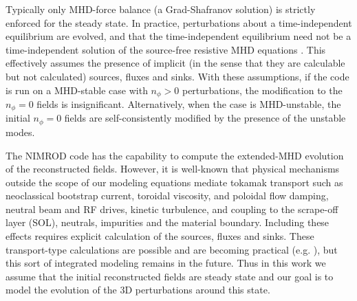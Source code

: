 % 

Typically only MHD-force balance (a Grad-Shafranov solution) is strictly
enforced for the steady state.  In practice, perturbations about a
time-independent equilibrium are evolved, and that the time-independent
equilibrium need not be a time-independent solution of the source-free
resistive MHD equations \cite{Sovinec04,charlton86}. This
effectively assumes the presence of implicit (in the sense that they are
calculable but not calculated) sources, fluxes and sinks.  With these
assumptions, if the code is run on a MHD-stable case with $n_\phi>0$
perturbations, the modification to the $n_\phi=0$ fields is insignificant.
Alternatively, when the case is MHD-unstable, the initial $n_\phi=0$ fields are
self-consistently modified by the presence of the unstable modes.

The NIMROD
code has the capability to compute the extended-MHD evolution of the
reconstructed fields. However, it is well-known that physical mechanisms
outside the scope of our modeling equations mediate tokamak transport such as
neoclassical bootstrap current, toroidal viscosity, and poloidal flow damping,
neutral beam and RF drives, kinetic turbulence, and coupling to the scrape-off layer
(SOL), neutrals, impurities and the material boundary. Including these effects
requires explicit calculation of the sources, fluxes and sinks. These
transport-type calculations are possible and are becoming practical (e.g.
\cite{Jenkins12,Jenkins15,held15}), but this sort of integrated modeling
remains in the future. Thus in this work we assume that the initial
reconstructed fields are steady state and our goal is to model the evolution of
the 3D perturbations around this state.
